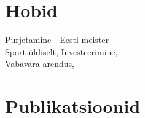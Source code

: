 \documentclass[]{deedy-resume-openfont}
\begin{document}
\begin{minipage}[t]{0.66\textwidth}

%
%


\section{Hobid} 

Purjetamine - Eesti meister \\ 
Sport üldiselt, Investeerimine, \\
Vabavara arendus, \\

\sectionspace %


\section{Publikatsioonid} 
\renewcommand\refname{\vskip -1.5em} %


\nocite{*}

\end{minipage} %



\end{document}
